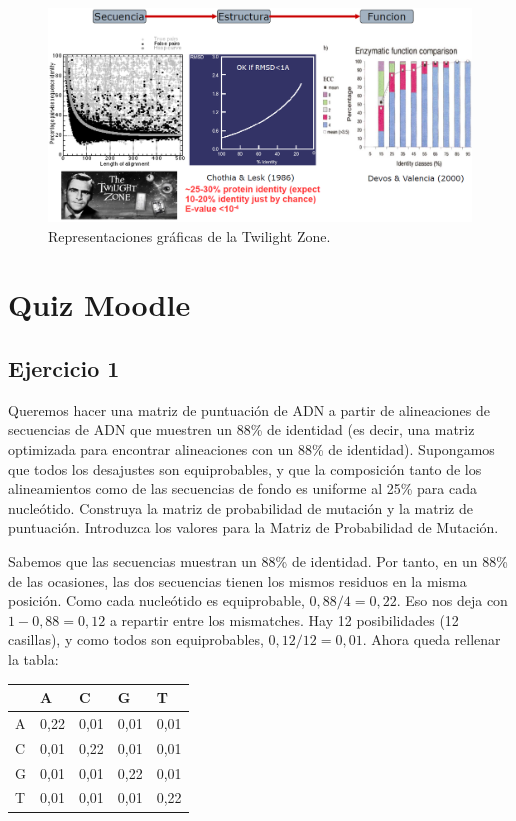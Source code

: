 \begin{figure}
\centering
\includegraphics[width = \textwidth]{figs/twilight-zone.png}
\caption{Representaciones gráficas de la Twilight Zone.}
\end{figure}

\section{Quiz Moodle}
\subsection{Ejercicio 1}
Queremos hacer una matriz de puntuación de ADN a partir de alineaciones de secuencias de ADN que muestren un 88\% de identidad (es decir, una matriz optimizada para encontrar alineaciones con un 88\% de identidad). Supongamos que todos los desajustes son equiprobables, y que la composición tanto de los alineamientos como de las secuencias de fondo es uniforme al 25\% para cada nucleótido. Construya la matriz de probabilidad de mutación y la matriz de puntuación. Introduzca los valores para la Matriz de Probabilidad de Mutación.

Sabemos que las secuencias muestran un 88\% de identidad. Por tanto, en un 88\% de las ocasiones, las dos secuencias tienen los mismos residuos en la misma posición. Como cada nucleótido es equiprobable, $0,88/4 = 0,22$. Eso nos deja con $1 - 0,88 = 0,12$ a repartir entre los mismatches. Hay 12 posibilidades (12 casillas), y como todos son equiprobables, $0,12 / 12 = 0,01$. Ahora queda rellenar la tabla:

\begin{table}[htbp]
    \centering
    \begin{tabularx}{\textwidth}{ X | X X X X}
          & A & C & G & T \\ \hline
         A & 0,22 & 0,01 & 0,01 & 0,01 \\
         C & 0,01 & 0,22& 0,01 & 0,01 \\
         G & 0,01 & 0,01 & 0,22 & 0,01 \\
         T & 0,01 & 0,01 & 0,01 & 0,22 \\
    \end{tabularx}
\end{table}

